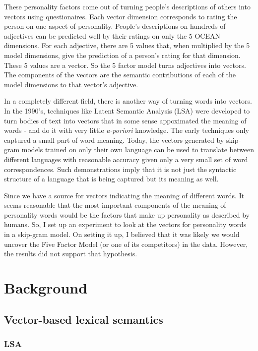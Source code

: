 \documentclass[10pt,letterpaper]{book}
\begin{document}
These personality factors come out of turning people's descriptions of others into vectors using questionaires. Each vector dimension corresponds to rating the person on one aspect of personality. People's descriptions on hundreds of adjectives can be predicted well by their ratings on only the 5 OCEAN dimensions. For each adjective, there are 5 values that, when multiplied by the 5 model dimensions, give the prediction of a person's rating for that dimension. These 5 values are a vector. So the 5 factor model turns adjectives into vectors. The components of the vectors are the semantic contributions of each of the model dimensions to that vector's adjective.

In a completely different field, there is another way of turning words into vectors. In the 1990's, techniques like Latent Semantic Analysis (LSA) were developed to turn bodies of text into vectors that in some sense appoximated the meaning of words - and do it with very little \textit{a-poriori} knowledge. The early techniques only captured a small part of word meaning. Today, the vectors generated by skip-gram models trained on only their own language can be used to translate between different languages with reasonable accuracy given only a very small set of word correspondences. Such demonstrations imply that it is not just the syntactic structure of a language that is being captured but its meaning as well.

Since we have a source for vectors indicating the meaning of different words. It seems reasonable that the most important components of the meaning of personality words would be the factors that make up personality as described by humans. So, I set up an experiment to look at the vectors for personality words in a skip-gram model. On setting it up, I believed that it was likely we would uncover the Five Factor Model (or one of its competitors) in the data. However, the results did not support that hypothesis.

\chapter{Background}

\section{Vector-based lexical semantics}

\subsection{LSA}
\end{document}
